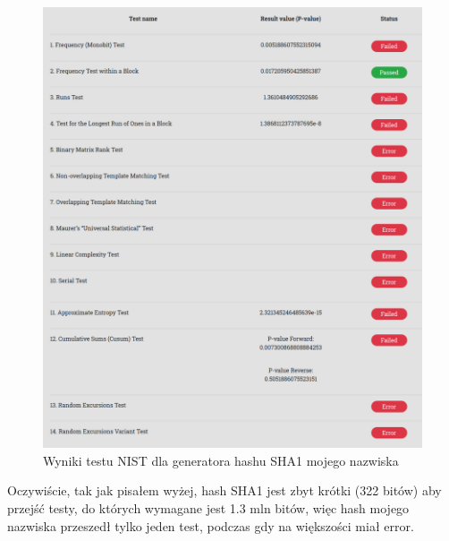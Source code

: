 \documentclass{report}
\begin{document}
\begin{figure}[H]
    \centering
    \includegraphics[scale=0.5]{../imie.png}
    \caption[Example .]{Wyniki testu NIST dla generatora hashu SHA1 mojego nazwiska}
    \label{plotB}
\end{figure}
Oczywiście, tak jak pisałem wyżej, hash SHA1 jest zbyt krótki (322 bitów) aby
przejść testy, do których wymagane jest 1.3 mln bitów, więc hash mojego nazwiska
przeszedł tylko jeden test, podczas gdy na większości miał error.
\end{document}
